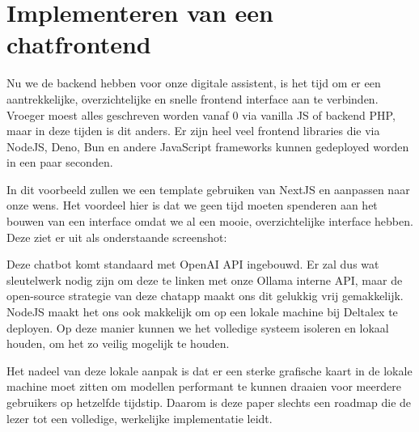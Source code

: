 \chapter{Implementeren van een chatfrontend}
Nu we de backend hebben voor onze digitale assistent, is het tijd om er een aantrekkelijke, overzichtelijke en snelle frontend interface aan te verbinden. 
Vroeger moest alles geschreven worden vanaf 0 via vanilla JS of backend PHP, maar in deze tijden is dit anders. 
Er zijn heel veel frontend libraries die via NodeJS, Deno, Bun en andere JavaScript frameworks kunnen gedeployed worden in een paar seconden. 

In dit voorbeeld zullen we een template gebruiken van NextJS en aanpassen naar onze wens. 
Het voordeel hier is dat we geen tijd moeten spenderen aan het bouwen van een interface omdat we al een mooie, overzichtelijke interface hebben. Deze ziet er uit als onderstaande screenshot:

\begin{figure}[h]
\end{figure}
\newpage

Deze chatbot komt standaard met OpenAI API ingebouwd. 
Er zal dus wat sleutelwerk nodig zijn om deze te linken met onze Ollama interne API, maar de open-source strategie van deze chatapp maakt ons dit gelukkig vrij gemakkelijk. 
NodeJS maakt het ons ook makkelijk om op een lokale machine bij Deltalex te deployen. 
Op deze manier kunnen we het volledige systeem isoleren en lokaal houden, om het zo veilig mogelijk te houden. 

Het nadeel van deze lokale aanpak is dat er een sterke grafische kaart in de lokale machine moet zitten om modellen performant te kunnen draaien voor meerdere gebruikers op hetzelfde tijdstip. 
Daarom is deze paper slechts een roadmap die de lezer tot een volledige, werkelijke implementatie leidt. 



